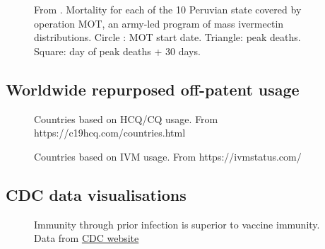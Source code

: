 \documentclass[11pt,a4paper,notitlepage]{report}
\begin{document}
\begin{figure}[h]
    \centering
    \caption{From \citet{Chamie2021}. Mortality for each of the 10 Peruvian state covered by operation MOT, an army-led program of mass ivermectin distributions. Circle : MOT start date. Triangle: peak deaths. Square: day of peak deaths + 30 days.}
    \label{fig:peru-operation-mot}
\end{figure}

\clearpage

\subsection*{Worldwide repurposed off-patent usage}

\begin{figure}[h]
    \centering
    \caption{Countries based on HCQ/CQ usage. From https://c19hcq.com/countries.html}
    \label{fig:hydroxychloroquine-countries}
\end{figure}

\begin{figure}[h]
    \centering
    \caption{Countries based on IVM usage. From https://ivmstatus.com/}
    \label{fig:ivermectin-countries}
\end{figure}

\clearpage

\subsection*{CDC data visualisations}

\begin{figure}[h]
    \centering
    \caption{Immunity through prior infection is superior to vaccine immunity. Data from \href{https://www.cdc.gov/mmwr/volumes/71/wr/mm7104e1.htm}{CDC website} \cite{cdc28012020}}
    \label{fig:CDC-natural-immunity}
\end{figure}
\end{document}
